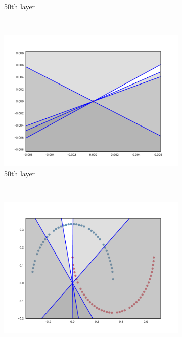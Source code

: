 \begin{figure}
\begin{subfigure}[b]{0.3\textwidth}
        \caption{\ReLU 50th layer}
        \label{fig:reluInit501}
    \end{subfigure}
    ~ %
    \begin{subfigure}[b]{0.3\textwidth}
        \includegraphics[width=\textwidth]{img/init/relu/conv2d_50-2.pdf}
        \caption{\ReLU 50th layer}
        \label{fig:reluIniti502}
    \end{subfigure}
    \\
    \begin{subfigure}[b]{0.3\textwidth}
        \includegraphics[width=\textwidth]{img/init/relu-bn/conv2d_1-0.pdf}

\end{subfigure}
\end{figure}
